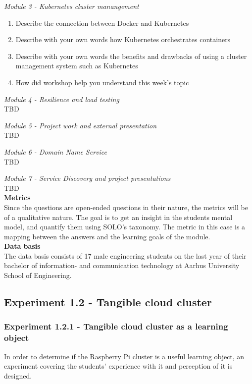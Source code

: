 \noindent\textit{Module 3 - Kubernetes cluster manangement}\\

\vspace{-5mm}
\begin{enumerate}
\setlength\itemsep{0.05em}
	\item Describe the connection between Docker and Kubernetes
	\item Describe with your own words how Kubernetes orchestrates containers
	\item Describe with your own words the benefits and drawbacks of using a cluster management system such as Kubernetes
	\item How did workshop help you understand this week's topic
\end{enumerate}

\noindent\textit{Module 4 - Resilience and load testing}\\
TBD

\noindent\textit{Module 5 - Project work and external presentation}\\
TBD

\noindent\textit{Module 6 - Domain Name Service}\\
TBD

\noindent\textit{Module 7 - Service Discovery and project presentations}\\
TBD \\

\noindent\textbf{Metrics} \\
Since the questions are open-ended questions in their nature, the metrics will be of a qualitative nature. The goal is to get an insight in the students mental model, and quantify them using  SOLO's taxonomy. The metric in this case is a mapping between the answers and the learning goals of the module.\\

\noindent\textbf{Data basis} \\
The data basis consists of 17 male engineering students on the last year of their bachelor of information- and communication technology at Aarhus University School of Engineering. \\

\subsection*{Experiment 1.2 - Tangible cloud cluster}
\subsubsection*{Experiment 1.2.1 - Tangible cloud cluster as a learning object}
In order to determine if the Raspberry Pi cluster is a useful learning object, an experiment covering the students' experience with it and perception of it is designed. \\


